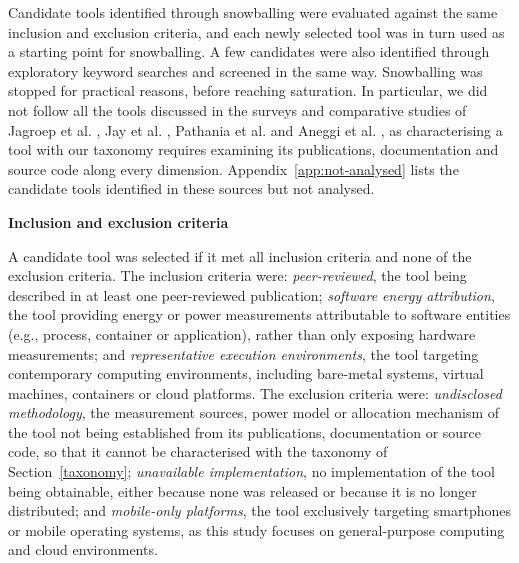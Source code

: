 \documentclass[
  acmsmall,
  screen,
  review,
  xcolor={dvipsnames,usenames}
]{acmart}
\begin{document}
Candidate tools identified through snowballing were evaluated against the same inclusion and exclusion criteria, and each newly selected tool was in turn used as a starting point for snowballing. A few candidates were also identified through exploratory keyword searches and screened in the same way. Snowballing was stopped for practical reasons, before reaching saturation. In particular, we did not follow all the tools discussed in the surveys and comparative studies of Jagroep et al. \cite{jagroepProfilingEnergyProfilers2015}, Jay et al. \cite{jayExperimentalComparisonSoftwarebased2023}, Pathania et al. \cite{pathaniaCalculatingSoftwaresEnergy2025} and Aneggi et al. \cite{aneggiMeasuringSoftwareEnergy2026}, as characterising a tool with our taxonomy requires examining its publications, documentation and source code along every dimension. Appendix~\ref{app:not-analysed} lists the candidate tools identified in these sources but not analysed.

\textbf{Inclusion and exclusion criteria}

A candidate tool was selected if it met all inclusion criteria and none of the exclusion criteria. The inclusion criteria were: \emph{peer-reviewed}, the tool being described in at least one peer-reviewed publication; \emph{software energy attribution}, the tool providing energy or power measurements attributable to software entities (e.g., process, container or application), rather than only exposing hardware measurements; and \emph{representative execution environments}, the tool targeting contemporary computing environments, including bare-metal systems, virtual machines, containers or cloud platforms. The exclusion criteria were: \emph{undisclosed methodology}, the measurement sources, power model or allocation mechanism of the tool not being established from its publications, documentation or source code, so that it cannot be characterised with the taxonomy of Section~\ref{taxonomy}; \emph{unavailable implementation}, no implementation of the tool being obtainable, either because none was released or because it is no longer distributed; and \emph{mobile-only platforms}, the tool exclusively targeting smartphones or mobile operating systems, as this study focuses on general-purpose computing and cloud environments.
\end{document}
